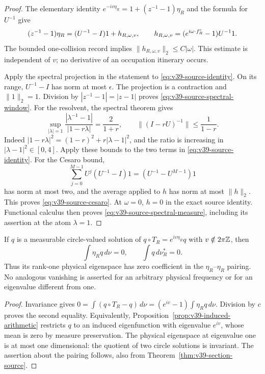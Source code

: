 \begin{proof}
The elementary identity $e^{-iv\eta_R}=1+(z^{-1}-1)\eta_R$ and
the formula for $U^{-1}$ give
\begin{equation}\label{eq:v39-source-identity}
 (z^{-1}-1)\eta_R=(U^{-1}-I)1+h_{R,\omega,v},\qquad
 h_{R,\omega,v}=(e^{i\omega\cdot f_R^{\rm c}}-1)U^{-1}1.
\end{equation}
The bounded one-collision record implies
$\|h_{R,\omega,v}\|_2\le C|\omega|$. This estimate is independent
of $v$; no derivative of an occupation itinerary occurs.

Apply the spectral projection in the statement to
\eqref{eq:v39-source-identity}. On its range, $U^{-1}-I$ has norm
at most $\epsilon$. The projection is a contraction and $\|1\|_2=1$.
Division by $|z^{-1}-1|=|z-1|$ proves
\eqref{eq:v39-source-spectral-window}.
For the resolvent, the spectral theorem gives
\[
 \sup_{|\lambda|=1}\frac{|\lambda^{-1}-1|}{|1-r\lambda|}
       =\frac2{1+r},\qquad
 \|(I-rU)^{-1}\|\le\frac1{1-r}.
\]
Indeed $|1-r\lambda|^2=(1-r)^2+r|\lambda-1|^2$, and the ratio
is increasing in $|\lambda-1|^2\in[0,4]$. Apply these bounds to the
two terms in \eqref{eq:v39-source-identity}. For the Cesaro bound,
\[
 \sum_{j=0}^{M-1}U^j(U^{-1}-I)1=(U^{-1}-U^{M-1})1
\]
has norm at most two, and the average applied to $h$ has norm at most
$\|h\|_2$. This proves \eqref{eq:v39-source-cesaro}.
At $\omega=0$, $h=0$ in the exact source identity. Functional calculus
then proves \eqref{eq:v39-source-spectral-measure}, including its
assertion at the atom $\lambda=1$.
\end{proof}

\begin{corollary}
\label{cor:v39-invisible-occupation-phase}
If $q$ is a measurable circle-valued solution of
$q\circ T_R=e^{iv\eta_R}q$ with $v\notin2\pi\mathbb Z$, then
\[
 \int\eta_Rq\,d\nu=0,\qquad \int q\,d\nu_R^*=0.
\]
Thus its rank-one physical eigenspace has zero coefficient in the
$\eta_R$--$\eta_R$ pairing. No analogous vanishing is asserted for
an arbitrary physical frequency or for an eigenvalue different from one.
\end{corollary}
\begin{proof}
Invariance gives
$0=\int(q\circ T_R-q)\,d\nu=(e^{iv}-1)\int\eta_Rq\,d\nu$.
Division by $c$ proves the second equality. Equivalently,
Proposition~\ref{prop:v39-induced-arithmetic} restricts $q$ to an
induced eigenfunction with eigenvalue $e^{iv}$, whose mean is zero by
measure preservation. The physical eigenspace at eigenvalue one is at
most one dimensional: the quotient of two circle solutions is invariant.
The assertion about the pairing follows, also from
Theorem~\ref{thm:v39-section-source}.
\end{proof}


